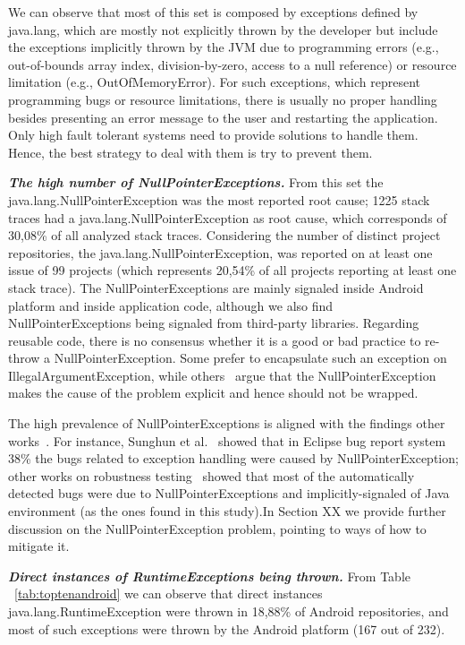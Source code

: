 \documentclass[conference]{IEEEtran}
\begin{document}
We can observe that most of this set is composed by exceptions defined by java.lang,
which are mostly not explicitly thrown by the developer but include
the exceptions implicitly thrown by the JVM due to programming errors 
(e.g., out-of-bounds array index, division-by-zero, access to a null reference)
 or resource limitation (e.g., OutOfMemoryError).
For such exceptions, which represent programming bugs or resource limitations, 
there is usually no proper handling besides presenting an error message to
 the user and restarting the application. Only high fault tolerant systems need to 
provide solutions to handle them. Hence, the best strategy to deal with them
is try to prevent them.

\emph{\textbf{The high number of NullPointerExceptions.}}
From this set the java.lang.NullPointerException was the most reported root cause; 1225 stack traces 
had a java.lang.NullPointerException  as root cause, which corresponds of 30,08\%  of 
all analyzed stack traces. Considering the number of distinct project repositories, 
the java.lang.NullPointerException, was reported on at least one issue of 99 projects 
(which represents 20,54\% of all projects reporting at least one stack trace).
 The NullPointerExceptions are mainly signaled inside Android platform and inside 
application code, although we also find
NullPointerExceptions being signaled from third-party libraries. Regarding
reusable code, there is no consensus whether it is a good or bad practice to 
re-throw a NullPointerException. Some prefer to encapsulate such an exception on
IllegalArgumentException, while others~\cite{bloch2008effective} argue that the
NullPointerException makes the cause of the problem explicit and hence 
should not be wrapped.

The high prevalence of NullPointerExceptions is aligned with the findings other 
works~\cite{kim2013predicting,fraser20131600,csallner2004jcrasher}. For instance, Sunghun et
al.~\cite{kim2013predicting} showed that in Eclipse bug report system 38\% the bugs 
related to exception handling were caused by NullPointerException; other works on robustness 
testing~\cite{maji2012empirical,csallner2004jcrasher} showed that most of the automatically 
detected bugs were due to NullPointerExceptions and implicitly-signaled of Java
environment (as the ones found in this study).In Section XX we provide further 
discussion on the NullPointerException problem, pointing 
to ways of how to mitigate it.

\emph{\textbf{Direct instances of RuntimeExceptions being thrown.}}
From Table ~\ref{tab:toptenandroid} we can observe that direct instances
java.lang.RuntimeException were thrown in 18,88\% of Android repositories, and
most of such exceptions  were  thrown by the Android platform (167 out of 232).
\end{document}
